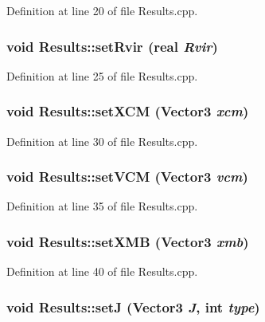 Definition at line 20 of file Results.cpp.\hypertarget{classResults_0e950675675a46df23e238e6bc70fa09}{
\subsubsection[setRvir]{\setlength{\rightskip}{0pt plus 5cm}void Results::setRvir ({\bf real} {\em Rvir})}}
\label{classResults_0e950675675a46df23e238e6bc70fa09}




Definition at line 25 of file Results.cpp.\hypertarget{classResults_32b4389a4ddfa7f71123083f3532d732}{
\subsubsection[setXCM]{\setlength{\rightskip}{0pt plus 5cm}void Results::setXCM ({\bf Vector3} {\em xcm})}}
\label{classResults_32b4389a4ddfa7f71123083f3532d732}




Definition at line 30 of file Results.cpp.\hypertarget{classResults_f57d334517edbff666eb9cface25b224}{
\subsubsection[setVCM]{\setlength{\rightskip}{0pt plus 5cm}void Results::setVCM ({\bf Vector3} {\em vcm})}}
\label{classResults_f57d334517edbff666eb9cface25b224}




Definition at line 35 of file Results.cpp.\hypertarget{classResults_d18101cd15bb458c403ead401e32d901}{
\subsubsection[setXMB]{\setlength{\rightskip}{0pt plus 5cm}void Results::setXMB ({\bf Vector3} {\em xmb})}}
\label{classResults_d18101cd15bb458c403ead401e32d901}




Definition at line 40 of file Results.cpp.\hypertarget{classResults_7c4269e38a488f47f99072fb1c4933e6}{
\subsubsection[setJ]{\setlength{\rightskip}{0pt plus 5cm}void Results::setJ ({\bf Vector3} {\em J}, \/  int {\em type})}}
\label{classResults_7c4269e38a488f47f99072fb1c4933e6}




